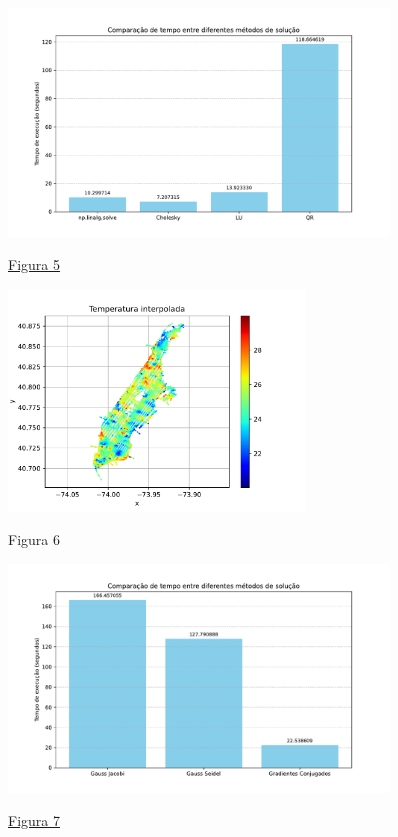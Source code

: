 \documentclass{article}
\begin{document}
    \hypertarget{2}{}
    \begin{figure}[ht]
        \centering
        \includegraphics[width=0.9\textwidth, trim={0 10px 0 25px},clip]{../figs/fig5.pdf}
        
        \hyperlink{1}{Figura 5}
    \end{figure}

    \newpage

    \begin{figure}[ht]
        \centering
        \includegraphics[width=0.7\textwidth, trim={0 10px 0 25px},clip]{../figs/fig6.pdf}
        
        Figura 6
    \end{figure}

    \hypertarget{4}{}
    \begin{figure}[ht]
        \centering
        \includegraphics[width=0.9\textwidth, trim={0 10px 0 25px},clip]{../figs/fig7.pdf}
        
        \hyperlink{3}{Figura 7}
    \end{figure}
\end{document}
